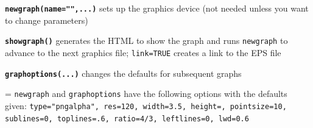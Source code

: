 \documentclass[10pt,landscape]{article}
\newcommand{\code}{\texttt}
\newcommand{\bcode}[1]{\texttt{\textbf{#1}}}
\begin{document}
\begin{multicols}{3}
\bcode{newgraph(name="",...)} sets up the graphics device (not needed unless you
want to change parameters)

\bcode{showgraph()} generates the HTML to show the graph and runs
\code{newgraph} to advance
to the next graphics file; \code{link=TRUE} creates a link to the EPS file

\bcode{graphoptions(...)} changes the defaults for subsequent graphs

\everypar={\hangindent=0mm}
\code{newgraph} and \code{graphoptions} have the following options
with the defaults given: \code{type="pngalpha", res=120,
width=3.5, height=, pointsize=10, sublines=0,
toplines=.6, ratio=4/3, leftlines=0, lwd=0.6}

\end{multicols}
\end{document}
